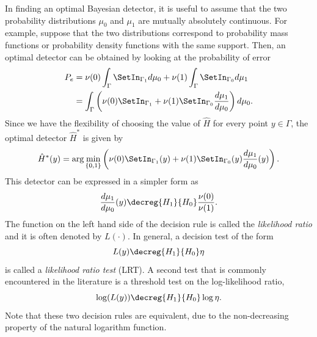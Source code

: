 In finding an optimal Bayesian detector, it is useful to assume that the two probability distributions $\mu_0$ and $\mu_1$ are mutually absolutely continuous.
For example, suppose that the two distributions correspond to probability mass functions or probability density functions with the same support.
Then, an optimal detector can be obtained by looking at the probability of error
\begin{equation*}
\begin{split}
P_e &=  \nu (0) \int_{ \Gamma } \SetIn_{ \Gamma_1 } d\mu_0
+ \nu (1) \int_{ \Gamma } \SetIn_{ \Gamma_0 } d\mu_1 \\
&=  \int_{ \Gamma } \left( \nu (0) \SetIn_{ \Gamma_1 }
+ \nu (1) \SetIn_{ \Gamma_0 } \frac{d\mu_1}{d\mu_0}
\right) d\mu_0 .
\end{split}
\end{equation*}
Since we have the flexibility of choosing the value of $\hat{H}$ for every point $y \in \Gamma$, the optimal detector $\hat{H}^*$ is given by
\begin{equation*}
\hat{H}^* (y) = \arg \min_{\{ 0, 1 \}}
\left( \nu (0) \SetIn_{ \Gamma_1 }(y)
+ \nu (1) \SetIn_{ \Gamma_0 }(y) \frac{d\mu_1}{d\mu_0} (y) \right) .
\end{equation*}
This detector can be expressed in a simpler form as
\begin{equation*}
\frac{d\mu_1}{d\mu_0} (y)
\decreg{H_1}{H_0}
\frac{\nu(0)}{\nu(1)} .
\end{equation*}
The function on the left hand side of the decision rule is called the \emph{likelihood ratio} and it is often denoted by $L(\cdot)$.
In general, a decision test of the form
\begin{equation*}
L(y) \decreg{H_1}{H_0} \eta
\end{equation*}
is called a \emph{likelihood ratio test} (LRT).
A second test that is commonly encountered in the literature is a threshold test on the log-likelihood ratio,
\begin{equation*}
\log ( L (y) )
\decreg{H_1}{H_0} \log \eta .
\end{equation*}
Note that these two decision rules are equivalent, due to the non-decreasing property of the natural logarithm function.

